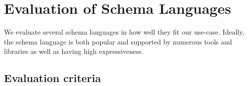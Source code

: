 


\section{Evaluation of Schema Languages}\label{sec:evaluation-of-schema-languages}



We evaluate several schema languages in how well they fit our use-case.
Ideally, the schema language is both popular and supported by numerous tools and libraries as well as having high expressiveness.

\subsection{Evaluation criteria} %

